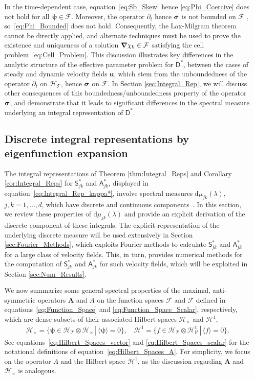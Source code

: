 \documentclass[leqno,onefignum,onetabnum]{siamltex1213}
\renewcommand{\d}{\mathrm{d}}
\newcommand{\Ab}{\mathbf{A}}
\newcommand{\Tc}{\mathcal{T}}
\newcommand{\Vc}{\mathcal{V}}
\newcommand{\Hc}{\mathcal{H}}
\newcommand{\Fc}{\mathcal{F}}
\newcommand{\Dm}{\mathsf{D}}
\newcommand{\Sm}{\mathsf{S}}
\newcommand{\Am}{\mathsf{A}}
\newcommand{\Hs}{\mathscr{H}}
\newcommand{\Fs}{\mathscr{F}}
\newcommand\bsig{\mbox{\boldmath${\sigma}$}}
\newcommand\bnabla{\mbox{\boldmath${\nabla}$}}
\newcommand{\vecu}{\boldsymbol{u}}
\newcommand{\vecpsi}{\boldsymbol{\psi}}
\begin{document}
In the time-dependent case, equation~\eqref{eq:Sb_Skew} hence
\eqref{eq:Phi_Coercive} does not hold for all $\vecpsi\in\Fc$. Moreover, 
the operator $\partial_t$ hence $\bsig$ is not bounded on $\Fc$
\cite{Reed-1980,Stakgold:BVP:2000}, so~\eqref{eq:Phi_Bounded} does not
hold. Consequently, the Lax-Milgram theorem cannot be directly
applied, and alternate techniques  
\cite{Friedman:1969:PDE,Friedman:1969:PDE:Parabolic} must be used to
prove the existence and uniqueness of a solution $\bnabla \chi_k\in\Fc$ 
satisfying the cell problem~\eqref{eq:Cell_Problem}. This discussion
illustrates key differences in the analytic structure of the effective
parameter problem for $\Dm^*$, between the cases of steady and
dynamic velocity fields $\vecu $, which stem from the unboundedness
of the operator $\partial_t$ on $\Hc_{\Tc}$, hence $\bsig$ on $\Fc$. In Section
\ref{sec:Integral_Rep}, we will discuss other consequences of this
boundedness/unboundedness property of the operator $\bsig$, and
demonstrate that it leads to significant differences in the spectral
measure underlying an  integral representation of $\Dm^*$.     


\subsection{Discrete integral representations by eigenfunction
  expansion}\label{sec:Eig_Funct_Exp} 
%
The integral representations of Theorem \ref{thm:Integral_Reps} and
Corollary \ref{cor:Integral_Reps} for $\Sm^*_{jk}$ and $\Am^*_{jk}$,
displayed in equation~\eqref{eq:Integral_Rep_kappa*},  involve
spectral measures $\d\mu_{jk}(\lambda)$, $j,k=1,\ldots,d$, which have discrete and
continuous components~\cite{Reed-1980,Stone:64}. In this section, we
review these properties of $\d\mu_{jk}(\lambda)$ and provide an explicit
derivation of the discrete component of these integrals. The 
explicit representation of the underlying discrete measure will
be used extensively in Section \ref{sec:Fourier_Methods}, which
exploits Fourier methods to calculate $\Sm^*_{jk}$ and $\Am^*_{jk}$ for a
large class of velocity fields. This, in turn, provides numerical
methods for the computation of $\Sm^*_{jk}$ and $\Am^*_{jk}$ for such
velocity fields, which will be exploited in Section
\ref{sec:Num_Results}.   



We now summarize some general spectral properties of the maximal,
anti-symmetric operators $\Ab$ and $A$ on the function spaces $\Fc$
and $\Fs$ defined in equations~\eqref{eq:Function_Space} and
\eqref{eq:Function_Space_Scalar}, respectively, which are dense
subsets of their associated Hilbert spaces $\Hc_\times$ and $\Hs^1$,  
%
\begin{align}\label{eq:Hilbert_Spaces_A}
  \Hc_\times=\{\vecpsi\in \Hc_\Tc\otimes\Hc_\times \,|\, \langle\vecpsi\rangle=0\},\quad
  \Hs^1=\{f\in \Hs_\Tc\otimes\Hs^1_\Vc \,|\, \langle f\rangle=0\}.
\end{align}
%
See equations~\eqref{eq:Hilbert_Spaces_vector} and
\eqref{eq:Hilbert_Spaces_scalar} for the notational definitions of
equation~\eqref{eq:Hilbert_Spaces_A}. For simplicity, we focus on the 
operator $A$ and the Hilbert space $\Hs^1$, as the discussion regarding
$\Ab$ and $\Hc_\times$ is analogous.
\end{document}

